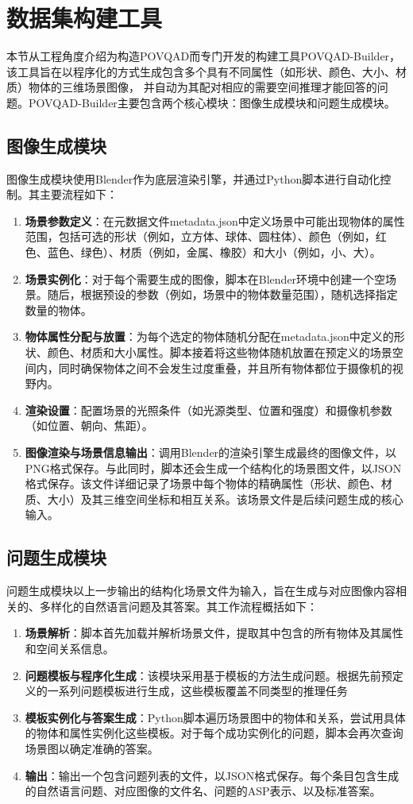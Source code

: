 \section{数据集构建工具}
本节从工程角度介绍为构造POVQAD而专门开发的构建工具POVQAD-Builder，该工具旨在以程序化的方式生成包含多个具有不同属性（如形状、颜色、大小、材质）物体的三维场景图像，
并自动为其配对相应的需要空间推理才能回答的问题。POVQAD-Builder主要包含两个核心模块：图像生成模块和问题生成模块。
\subsection{图像生成模块}
图像生成模块使用Blender作为底层渲染引擎，并通过Python脚本进行自动化控制。其主要流程如下：
\begin{enumerate}[nosep]
\item \textbf{场景参数定义}：在元数据文件metadata.json中定义场景中可能出现物体的属性范围，包括可选的形状（例如，立方体、球体、圆柱体）、颜色（例如，红色、蓝色、绿色）、材质（例如，金属、橡胶）和大小（例如，小、大）。
\item \textbf{场景实例化}：对于每个需要生成的图像，脚本在Blender环境中创建一个空场景。随后，根据预设的参数（例如，场景中的物体数量范围），随机选择指定数量的物体。
\item \textbf{物体属性分配与放置}：为每个选定的物体随机分配在metadata.json中定义的形状、颜色、材质和大小属性。脚本接着将这些物体随机放置在预定义的场景空间内，同时确保物体之间不会发生过度重叠，并且所有物体都位于摄像机的视野内。
\item \textbf{渲染设置}：配置场景的光照条件（如光源类型、位置和强度）和摄像机参数（如位置、朝向、焦距）。
\item \textbf{图像渲染与场景信息输出}：调用Blender的渲染引擎生成最终的图像文件，以PNG格式保存。与此同时，脚本还会生成一个结构化的场景图文件，以JSON格式保存。该文件详细记录了场景中每个物体的精确属性（形状、颜色、材质、大小）及其三维空间坐标和相互关系。该场景文件是后续问题生成的核心输入。
\end{enumerate}
\subsection{问题生成模块}
问题生成模块以上一步输出的结构化场景文件为输入，旨在生成与对应图像内容相关的、多样化的自然语言问题及其答案。其工作流程概括如下：
\begin{enumerate}[nosep]
\item \textbf{场景解析}：脚本首先加载并解析场景文件，提取其中包含的所有物体及其属性和空间关系信息。
\item \textbf{问题模板与程序化生成}：该模块采用基于模板的方法生成问题。根据先前预定义的一系列问题模板进行生成，这些模板覆盖不同类型的推理任务
\item \textbf{模板实例化与答案生成}：Python脚本遍历场景图中的物体和关系，尝试用具体的物体和属性实例化这些模板。对于每个成功实例化的问题，脚本会再次查询场景图以确定准确的答案。
\item \textbf{输出}：输出一个包含问题列表的文件，以JSON格式保存。每个条目包含生成的自然语言问题、对应图像的文件名、问题的ASP表示、以及标准答案。
\end{enumerate}
